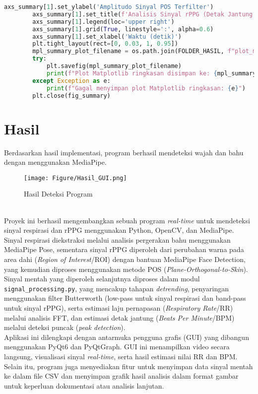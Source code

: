 \documentclass[11pt,a4paper]{article}
\begin{document}
\begin{lstlisting}[language=Python, caption=Kelas RealTimeSignalWorker,label={labelkode}]
        axs_summary[1].set_ylabel('Amplitudo Sinyal POS Terfilter')
        axs_summary[1].set_title(f'Analisis Sinyal rPPG (Detak Jantung - dari Data CSV)')
        axs_summary[1].legend(loc='upper right')
        axs_summary[1].grid(True, linestyle=':', alpha=0.6)
        axs_summary[1].set_xlabel('Waktu (detik)')
        plt.tight_layout(rect=[0, 0.03, 1, 0.95]) 
        mpl_summary_plot_filename = os.path.join(FOLDER_HASIL, f"plot_matplotlib_ringkasan_signal_{base_filename_csv}.png")
        try:
            plt.savefig(mpl_summary_plot_filename)
            print(f"Plot Matplotlib ringkasan disimpan ke: {mpl_summary_plot_filename}")
        except Exception as e:
            print(f"Gagal menyimpan plot Matplotlib ringkasan: {e}")
        plt.close(fig_summary) 
    \end{lstlisting}

\section{Hasil}
     Berdasarkan hasil implementasi, program berhasil mendeteksi wajah dan bahu dengan menggunakan MediaPipe.
\begin{figure}[h]
    \centering
    \texttt{[image: Figure/Hasil\_GUI.png]}
    \caption{Hasil Deteksi Program}
    \label{fig:my_label}
\end{figure}\\

    Proyek ini berhasil mengembangkan sebuah program \textit{real-time} untuk mendeteksi sinyal respirasi dan rPPG menggunakan Python, OpenCV, dan MediaPipe. Sinyal respirasi diekstraksi melalui analisis pergerakan bahu menggunakan MediaPipe Pose, sementara sinyal rPPG diperoleh dari perubahan warna pada area dahi (\textit{Region of Interest}/ROI) dengan bantuan MediaPipe Face Detection, yang kemudian diproses menggunakan metode POS (\textit{Plane-Orthogonal-to-Skin}).\\
    Sinyal mentah yang diperoleh selanjutnya diproses dalam modul \texttt{signal\_processing.py}, yang mencakup tahapan \textit{detrending}, penyaringan menggunakan filter Butterworth (low-pass untuk sinyal respirasi dan band-pass untuk sinyal rPPG), serta estimasi laju pernapasan (\textit{Respiratory Rate}/RR) melalui analisis FFT, dan estimasi detak jantung (\textit{Beats Per Minute}/BPM) melalui deteksi puncak (\textit{peak detection}).\\
    Aplikasi ini dilengkapi dengan antarmuka pengguna grafis (GUI) yang dibangun menggunakan PyQt6 dan PyQtGraph. GUI ini menampilkan video secara langsung, visualisasi sinyal \textit{real-time}, serta hasil estimasi nilai RR dan BPM. Selain itu, program juga menyediakan fitur untuk menyimpan data sinyal mentah ke dalam file CSV dan menyimpan grafik hasil analisis dalam format gambar untuk keperluan dokumentasi atau analisis lanjutan.
\end{document}
